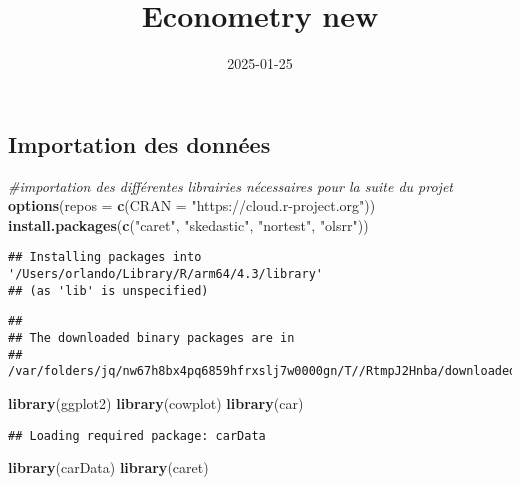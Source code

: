 \documentclass[
]{article}
\title{Econometry new}
\author{}
\date{\vspace{-2.5em}2025-01-25}
\newenvironment{Shaded}{\begin{snugshade}}{\end{snugshade}}
\newcommand{\AttributeTok}[1]{\textcolor[rgb]{0.13,0.29,0.53}{#1}}
\newcommand{\CommentTok}[1]{\textcolor[rgb]{0.56,0.35,0.01}{\textit{#1}}}
\newcommand{\FunctionTok}[1]{\textcolor[rgb]{0.13,0.29,0.53}{\textbf{#1}}}
\newcommand{\NormalTok}[1]{#1}
\newcommand{\StringTok}[1]{\textcolor[rgb]{0.31,0.60,0.02}{#1}}
\begin{document}
\maketitle

\subsection{Importation des données}\label{importation-des-donnuxe9es}

\begin{Shaded}
\begin{Highlighting}[]
\CommentTok{\#importation des différentes librairies nécessaires pour la suite du projet}
\FunctionTok{options}\NormalTok{(}\AttributeTok{repos =} \FunctionTok{c}\NormalTok{(}\AttributeTok{CRAN =} \StringTok{"https://cloud.r{-}project.org"}\NormalTok{))}
\FunctionTok{install.packages}\NormalTok{(}\FunctionTok{c}\NormalTok{(}\StringTok{"caret"}\NormalTok{, }\StringTok{"skedastic"}\NormalTok{, }\StringTok{"nortest"}\NormalTok{, }\StringTok{"olsrr"}\NormalTok{))}
\end{Highlighting}
\end{Shaded}

\begin{verbatim}
## Installing packages into '/Users/orlando/Library/R/arm64/4.3/library'
## (as 'lib' is unspecified)
\end{verbatim}

\begin{verbatim}
## 
## The downloaded binary packages are in
##  /var/folders/jq/nw67h8bx4pq6859hfrxslj7w0000gn/T//RtmpJ2Hnba/downloaded_packages
\end{verbatim}

\begin{Shaded}
\begin{Highlighting}[]
\FunctionTok{library}\NormalTok{(ggplot2)}
\FunctionTok{library}\NormalTok{(cowplot)}
\FunctionTok{library}\NormalTok{(car)}
\end{Highlighting}
\end{Shaded}

\begin{verbatim}
## Loading required package: carData
\end{verbatim}

\begin{Shaded}
\begin{Highlighting}[]
\FunctionTok{library}\NormalTok{(carData)}
\FunctionTok{library}\NormalTok{(caret)}
\end{Highlighting}
\end{Shaded}
\end{document}
